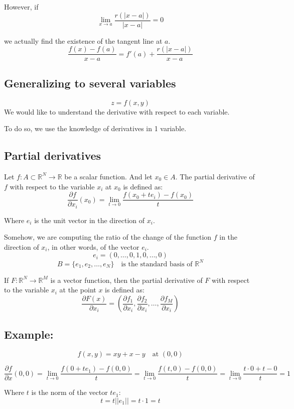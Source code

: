 \documentclass[11pt]{article}
\begin{document}
However, if
\[
\lim_{x \to a} \frac{r(|x - a|)}{|x - a|} = 0
\]

we actually find the existence of the tangent line at $a$.
\[
\frac{f(x) - f(a)}{x - a} = f'(a) + \frac{r(|x - a|)}{x - a}
\]

\subsection{Generalizing to several variables}
\[
z = f(x,y)
\]
We would like to understand the derivative with respect to each variable.

To do so, we use the knowledge of derivatives in 1 variable.

\subsection{Partial derivatives}
Let $f : A \subset \mathbb{R}^N \rightarrow \mathbb{R}$ be a scalar function. And let $x_0 \in A$. The partial derivative of $f$ with respect to the variable $x_i$ at $x_0$ is defined as:
\[
\frac{\partial f}{\partial x_i}(x_0) = \lim_{t \to 0} \frac{f(x_0 + t e_i) - f(x_0)}{t}
\]

Where $e_i$ is the unit vector in the direction of $x_i$.

Somehow, we are computing the ratio of the change of the function $f$ in the direction of $x_i$, in other words, of the vector $e_i$.
\[
e_i = (0, \ldots, 0, 1, 0, \ldots, 0)
\]
\[
B = \{e_1, e_2, \ldots, e_N\} \quad \text{is the standard basis of } \mathbb{R}^N
\]

If $F : \mathbb{R}^N \rightarrow \mathbb{R}^M$ is a vector function, then the partial derivative of $F$ with respect to the variable $x_i$ at the point $x$ is defined as:
\[
\frac{\partial F(x)}{\partial x_i} = \left(\frac{\partial f_1}{\partial x_i}, \frac{\partial f_2}{\partial x_i}, \ldots, \frac{\partial f_M}{\partial x_i}\right)
\]

\subsection*{Example:}
\[
f(x,y) = xy +x - y \quad \text{at } (0,0)
\]

\[
\frac{\partial f}{\partial x}(0,0) = \lim_{t \to 0} \frac{f(0 + t e_1) - f(0,0)}{t} = \lim_{t \to 0} \frac{f(t,0) - f(0,0)}{t} = \lim_{t \to 0} \frac{t \cdot 0 + t - 0}{t} = 1
\]

Where $t$ is the norm of the vector $t e_1$:
\[
t = t ||e_1|| = t \cdot 1 = t
\]
\end{document}
